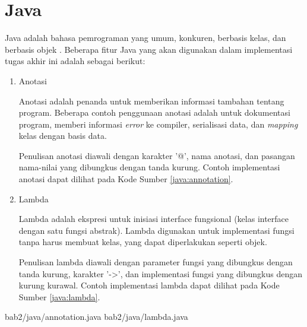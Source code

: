 \section{Java}
\par Java adalah bahasa pemrograman yang umum, konkuren, berbasis kelas, dan berbasis objek \cite{java-online}. Beberapa fitur Java yang akan digunakan dalam implementasi tugas akhir ini adalah sebagai berikut:
\begin{enumerate}[listparindent=2.5em]
	\item Anotasi
	\par Anotasi adalah penanda untuk memberikan informasi tambahan tentang program. Beberapa contoh penggunaan anotasi adalah untuk dokumentasi program, memberi informasi \textit{error} ke compiler, serialisasi data, dan \textit{mapping} kelas dengan basis data. 
	\par Penulisan anotasi diawali dengan karakter '@', nama anotasi, dan pasangan nama-nilai yang dibungkus dengan tanda kurung. Contoh implementasi anotasi dapat dilihat pada Kode Sumber \ref{java:annotation}.
	\item Lambda
	\par Lambda adalah ekspresi untuk inisiasi interface fungsional (kelas interface dengan satu fungsi abstrak). Lambda digunakan untuk implementasi fungsi tanpa harus membuat kelas, yang dapat diperlakukan seperti objek.
	\par Penulisan lambda diawali dengan parameter fungsi yang dibungkus dengan tanda kurung, karakter '->', dan implementasi fungsi yang dibungkus dengan kurung kurawal. Contoh implementasi lambda dapat dilihat pada Kode Sumber \ref{java:lambda}.
\end{enumerate}
 {bab2/java/annotation.java}
\clearpage
 {bab2/java/lambda.java}

